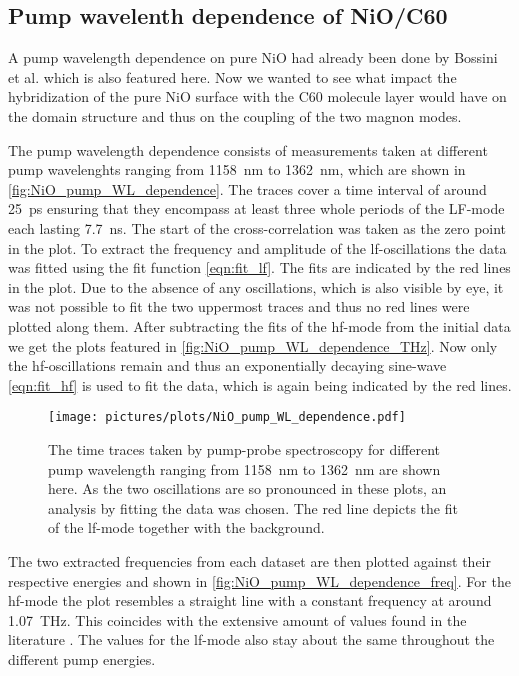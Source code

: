 \subsection{Pump wavelenth dependence of NiO/C60}
A pump wavelength dependence on pure NiO had already been done by Bossini et al.  which is also featured here.
Now we wanted to see what impact the hybridization of the pure NiO surface with the C60 molecule layer would have on the domain structure and thus on the coupling of the two magnon modes.

The pump wavelength dependence consists of measurements taken at different pump wavelenghts ranging from \qty{1158}{nm} to \qty{1362}{nm}, which are shown in \autoref{fig:NiO_pump_WL_dependence}.
The traces cover a time interval of around \qty{25}{ps} ensuring that they encompass at least three whole periods of the LF-mode each lasting \qty{7.7}{ns}.
The start of the cross-correlation was taken as the zero point in the plot.
To extract the frequency and amplitude of the lf-oscillations the data was fitted using the fit function \autoref{eqn:fit_lf}.
The fits are indicated by the red lines in the plot. 
Due to the absence of any oscillations, which is also visible by eye, it was not possible to fit the two uppermost traces and thus no red lines were plotted along them.
After subtracting the fits of the hf-mode from the initial data we get the plots featured in \autoref{fig:NiO_pump_WL_dependence_THz}.
Now only the hf-oscillations remain and thus an exponentially decaying sine-wave \autoref{eqn:fit_hf} is used to fit the data, which is again being indicated by the red lines.
\begin{figure}[ht]
    \centering
    \texttt{[image: pictures/plots/NiO\_pump\_WL\_dependence.pdf]}
    \caption{The time traces taken by pump-probe spectroscopy for different pump wavelength ranging from \qty{1158}{nm} to \qty{1362}{nm} are shown here. As the two oscillations are so pronounced in these plots, an analysis by fitting the data was chosen. The red line depicts the fit of the lf-mode together with the background.}
    \label{fig:NiO_pump_WL_dependence}
\end{figure}
\FloatBarrier
The two extracted frequencies from each dataset are then plotted against their respective energies and shown in \autoref{fig:NiO_pump_WL_dependence_freq}.
For the hf-mode the plot resembles a straight line with a constant frequency at around \qty{1.07}{THz}.
This coincides with the extensive amount of values found in the literature .
The values for the lf-mode also stay about the same throughout the different pump energies.
